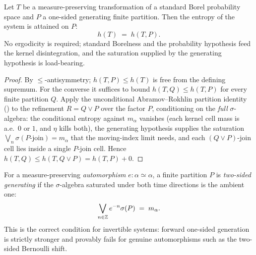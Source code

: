 \begin{theorem}\label{ksEntropy_eq_ksEntropyPartition_of_generating}
  \leanok
  Let \(T\) be a measure-preserving transformation of a standard Borel probability space and
  \(P\) a one-sided generating finite partition. Then the entropy of the system is attained on
  \(P\):
  \[
    h(T) \;=\; h(T,P).
  \]
  No ergodicity is required; standard Borelness and the probability hypothesis feed the kernel
  disintegration, and the saturation supplied by the generating hypothesis is load-bearing.
\end{theorem}
\begin{proof}\leanok
  By \(\le\)-antisymmetry; \(h(T,P)\le h(T)\) is free from the defining supremum. For the
  converse it suffices to bound \(h(T,Q)\le h(T,P)\) for every finite partition \(Q\). Apply the
  unconditional Abramov--Rokhlin partition identity () to the
  refinement \(R=Q\vee P\) over the factor \(P\), conditioning on the \emph{full}
  \(\sigma\)-algebra: the conditional entropy against \(m_\alpha\) vanishes (each kernel cell mass
  is a.e.\ \(0\) or \(1\), and \(\eta\) kills both), the generating hypothesis supplies the
  saturation \(\bigvee_n\sigma(P\text{-join})=m_\alpha\) that the moving-index limit needs, and
  each \((Q\vee P)\)-join cell lies inside a single \(P\)-join cell. Hence
  \(h(T,Q)\le h(T,Q\vee P)=h(T,P)+0\).
\end{proof}

\begin{definition}\label{IsGeneratingTwoSided}
  \leanok
  For a measure-preserving \emph{automorphism} \(e:\alpha\simeq\alpha\), a finite partition \(P\)
  is \emph{two-sided generating} if the \(\sigma\)-algebra saturated under both time directions is
  the ambient one:
  \[
    \bigvee_{n\in\mathbb{Z}} e^{-n}\sigma(P) \;=\; m_\alpha.
  \]
  This is the correct condition for invertible systems: forward one-sided generation is strictly
  stronger and provably fails for genuine automorphisms such as the two-sided Bernoulli shift.
\end{definition}

